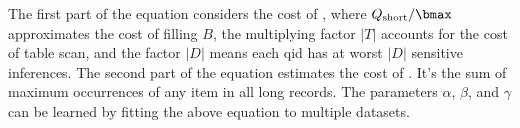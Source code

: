 The first part of the equation considers the cost of \HandleShortRecords,
where $Q_\text{short}/\bmax$ approximates the cost of filling $B$, the
multiplying factor $|T|$ accounts for the cost of table scan, and
the factor $|D|$ means each qid has at worst $|D|$ sensitive inferences.
The second part of the equation estimates the cost of \HandleLongRecord.
It's the sum of maximum occurrences of any item in all long records.
The parameters $\alpha$, $\beta$, and $\gamma$ can be learned by fitting
the above equation to multiple datasets.

%
%
%
%
%
